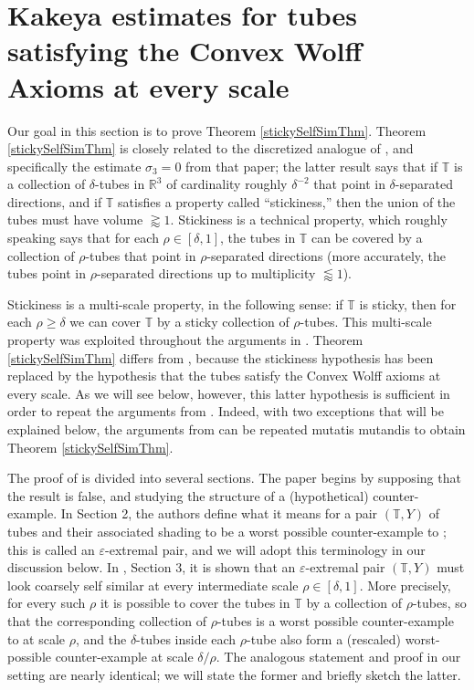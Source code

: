 \documentclass[letterpaper, reqno,11pt]{article}
\numberwithin{equation}{section}
\newcommand{\RR}{\mathbb{R}}
\newcommand{\eps}{\varepsilon}
\newcommand{\tubes}{\mathbb{T}}
\numberwithin{thm}{section}
\theoremstyle{remark}
\begin{document}





 \section{Kakeya estimates for tubes satisfying the Convex Wolff Axioms at every scale}\label{stickySelfSimThmSec}
Our goal in this section is to prove Theorem \ref{stickySelfSimThm}. Theorem \ref{stickySelfSimThm} is closely related to the discretized analogue of \cite[Theorem 1.1]{WZ}, and specifically the estimate $\sigma_3=0$ from that paper; the latter result says that if $\tubes$ is a collection of $\delta$-tubes in $\RR^3$ of cardinality roughly $\delta^{-2}$ that point in $\delta$-separated directions, and if $\tubes$ satisfies a property called ``stickiness,'' then the union of the tubes must have volume $\gtrapprox 1$. Stickiness is a technical property, which roughly speaking says that for each $\rho\in[\delta,1]$, the tubes in $\tubes$ can be covered by a collection of $\rho$-tubes that point in $\rho$-separated directions (more accurately, the tubes point in $\rho$-separated directions up to multiplicity $\lessapprox 1$). 

Stickiness is a multi-scale property, in the following sense: if $\tubes$ is sticky, then for each $\rho\geq\delta$ we can cover $\tubes$ by a sticky collection of $\rho$-tubes. This multi-scale property was exploited throughout the arguments in \cite{WZ}. Theorem \ref{stickySelfSimThm} differs from \cite[Theorem 1.1]{WZ}, because the stickiness hypothesis has been replaced by the hypothesis that the tubes satisfy the Convex Wolff axioms at every scale. As we will see below, however, this latter hypothesis is sufficient in order to repeat the arguments from  \cite{WZ}. Indeed, with two exceptions that will be explained below, the arguments from  \cite{WZ} can be repeated mutatis mutandis to obtain Theorem \ref{stickySelfSimThm}.


The proof of \cite[Theorem 1.1]{WZ} is divided into several sections. The paper begins by supposing that the result is false, and studying the structure of a (hypothetical) counter-example. In Section 2, the authors define what it means for a pair $(\tubes,Y)$ of tubes and their associated shading to be a worst possible counter-example to \cite[Theorem 1.1]{WZ}; this is called an $\eps$-extremal pair, and we will adopt this terminology in our discussion below. In \cite{WZ}, Section 3, it is shown that an $\eps$-extremal pair $(\tubes,Y)$ must look coarsely self similar at every intermediate scale $\rho \in [\delta,1]$. More precisely, for every such $\rho$ it is possible to cover the tubes in $\tubes$ by a collection of $\rho$-tubes, so that the corresponding collection of $\rho$-tubes is a worst possible counter-example to \cite[Theorem 1.1]{WZ} at scale $\rho$, and the $\delta$-tubes inside each $\rho$-tube also form a (rescaled) worst-possible counter-example at scale $\delta/\rho$. The analogous statement and proof in our setting are nearly identical; we will state the former and briefly sketch the latter.
\end{document}
